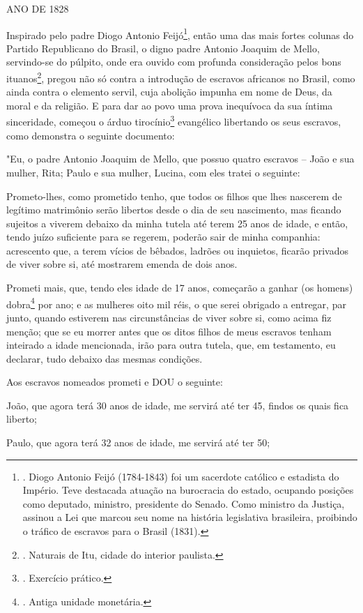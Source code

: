 ANO DE 1828

Inspirado pelo padre Diogo Antonio Feijó\footnote{. Diogo Antonio Feijó
  (1784-1843) foi um sacerdote católico e estadista do Império. Teve
  destacada atuação na burocracia do estado, ocupando posições como
  deputado, ministro, presidente do Senado. Como ministro da Justiça,
  assinou a Lei que marcou seu nome na história legislativa brasileira,
  proibindo o tráfico de escravos para o Brasil (1831).}, então uma das
mais fortes colunas do Partido Republicano do Brasil, o digno padre
Antonio Joaquim de Mello, servindo-se do púlpito, onde era ouvido com
profunda consideração pelos bons ituanos\footnote{. Naturais de Itu,
  cidade do interior paulista.}, pregou não só contra a introdução de
escravos africanos no Brasil, como ainda contra o elemento servil, cuja
abolição impunha em nome de Deus, da moral e da religião. E para dar ao
povo uma prova inequívoca da sua íntima sinceridade, começou o árduo
tirocínio\footnote{. Exercício prático.} evangélico libertando os seus
escravos, como demonstra o seguinte documento:

"Eu, o padre Antonio Joaquim de Mello, que possuo quatro escravos --
João e sua mulher, Rita; Paulo e sua mulher, Lucina, com eles tratei o
seguinte:

Prometo-lhes, como prometido tenho, que todos os filhos que lhes
nascerem de legítimo matrimônio serão libertos desde o dia de seu
nascimento, mas ficando sujeitos a viverem debaixo da minha tutela até
terem 25 anos de idade, e então, tendo juízo suficiente para se regerem,
poderão sair de minha companhia: acrescento que, a terem vícios de
bêbados, ladrões ou inquietos, ficarão privados de viver sobre si, até
mostrarem emenda de dois anos.

Prometi mais, que, tendo eles idade de 17 anos, começarão a ganhar (os
homens) dobra\footnote{. Antiga unidade monetária.} por ano; e as
mulheres oito mil réis, o que serei obrigado a entregar, par junto,
quando estiverem nas circunstâncias de viver sobre si, como acima fiz
menção; que se eu morrer antes que os ditos filhos de meus escravos
tenham inteirado a idade mencionada, irão para outra tutela, que, em
testamento, eu declarar, tudo debaixo das mesmas condições.

Aos escravos nomeados prometi e DOU o seguinte:

João, que agora terá 30 anos de idade, me servirá até ter 45, findos os
quais fica liberto;

Paulo, que agora terá 32 anos de idade, me servirá até ter 50;

